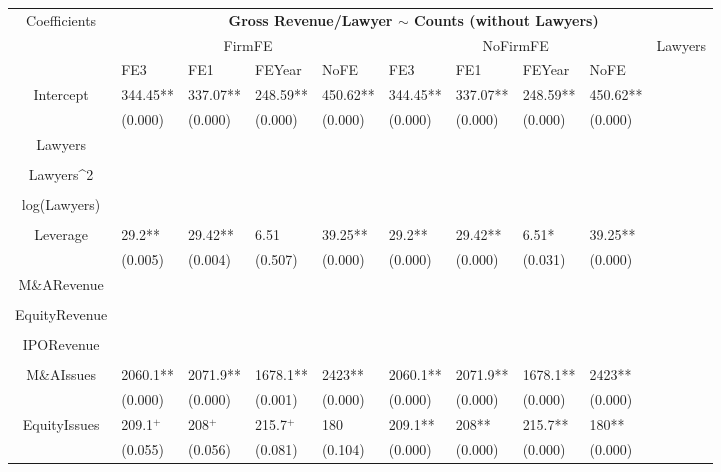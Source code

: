 \documentclass{article}
\begin{document}
\begin{table}[H]
\centering
\begin{tabular}{|clllllllll|}
\hline
\multirow{3}{*}{Coefficients} & \multicolumn{9}{c|}{\textbf{Gross Revenue/Lawyer $\sim$ Counts (without Lawyers)}} \\
\cline{2-10}
& \multicolumn{4}{c}{FirmFE} & \multicolumn{4}{c}{NoFirmFE} & \multirow{2}{*}{Lawyers} \\
\cline{2-9}
& FE3 & FE1 & FEYear & NoFE & FE3 & FE1 & FEYear & NoFE &  \\
\hline
 
Intercept & 344.45** & 337.07** & 248.59** & 450.62** & 344.45** & 337.07** & 248.59** & 450.62** & \\ 
   & (0.000) & (0.000) & (0.000) & (0.000) & (0.000) & (0.000) & (0.000) & (0.000) & \\ 
  Lawyers &  &  &  &  &  &  &  &  & \\ 
   &  &  &  &  &  &  &  &  & \\ 
  Lawyers^2 &  &  &  &  &  &  &  &  & \\ 
   &  &  &  &  &  &  &  &  & \\ 
  log(Lawyers) &  &  &  &  &  &  &  &  & \\ 
   &  &  &  &  &  &  &  &  & \\ 
  Leverage & 29.2** & 29.42** & 6.51 & 39.25** & 29.2** & 29.42** & 6.51* & 39.25** & \\ 
   & (0.005) & (0.004) & (0.507) & (0.000) & (0.000) & (0.000) & (0.031) & (0.000) & \\ 
  M\&ARevenue &  &  &  &  &  &  &  &  & \\ 
   &  &  &  &  &  &  &  &  & \\ 
  EquityRevenue &  &  &  &  &  &  &  &  & \\ 
   &  &  &  &  &  &  &  &  & \\ 
  IPORevenue &  &  &  &  &  &  &  &  & \\ 
   &  &  &  &  &  &  &  &  & \\ 
  M\&AIssues & 2060.1** & 2071.9** & 1678.1** & 2423** & 2060.1** & 2071.9** & 1678.1** & 2423** & \\ 
   & (0.000) & (0.000) & (0.001) & (0.000) & (0.000) & (0.000) & (0.000) & (0.000) & \\ 
  EquityIssues & 209.1$^{+}$ & 208$^{+}$ & 215.7$^{+}$ & 180 & 209.1** & 208** & 215.7** & 180** & \\ 
   & (0.055) & (0.056) & (0.081) & (0.104) & (0.000) & (0.000) & (0.000) & (0.000) & \\ 

\end{tabular}
\end{table}
\end{document}
